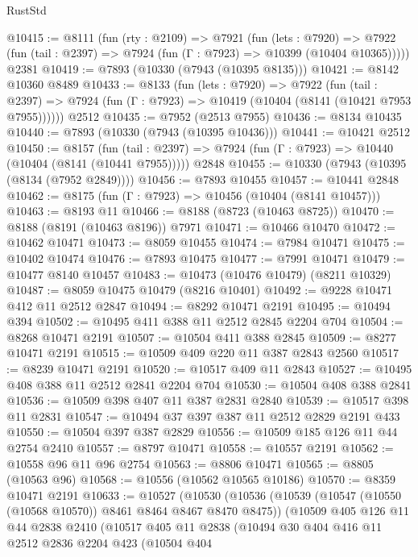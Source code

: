 \begin{lexlean}{RustStd}
\begin{coremodule}
{\begin{coremodule}
{{{{{{{{{{{{{{{{{{{{{{{{{{{{{{{{{{{{{{{{{{{{{{{{{{@10415 := @8111
    (fun (rty : @2109) =>
    @7921
      (fun (lets : @7920) =>
      @7922 (fun (tail : @2397) => @7924 (fun (Γ : @7923) => @10399 (@10404 @10365)))))
    @2381
@10419 := @7893 (@10330 (@7943 (@10395 @8135)))
@10421 := @8142 @10360 @8489
@10433 := @8133
    (fun (lets : @7920) =>
    @7922
      (fun (tail : @2397) =>
      @7924 (fun (Γ : @7923) => @10419 (@10404 (@8141 (@10421 @7953 @7955))))))
    @2512
@10435 := @7952 (@2513 @7955)
@10436 := @8134 @10435
@10440 := @7893 (@10330 (@7943 (@10395 @10436)))
@10441 := @10421 @2512
@10450 := @8157
    (fun (tail : @2397) => @7924 (fun (Γ : @7923) => @10440 (@10404 (@8141 (@10441 @7955)))))
    @2848
@10455 := @10330 (@7943 (@10395 (@8134 (@7952 @2849))))
@10456 := @7893 @10455
@10457 := @10441 @2848
@10462 := @8175 (fun (Γ : @7923) => @10456 (@10404 (@8141 @10457)))
@10463 := @8193 @11
@10466 := @8188 (@8723 (@10463 @8725))
@10470 := @8188 (@8191 (@10463 @8196)) @7971
@10471 := @10466 @10470
@10472 := @10462 @10471
@10473 := @8059 @10455
@10474 := @7984 @10471
@10475 := @10402 @10474
@10476 := @7893 @10475
@10477 := @7991 @10471
@10479 := @10477 @8140 @10457
@10483 := @10473 (@10476 @10479) (@8211 @10329)
@10487 := @8059 @10475 @10479 (@8216 @10401)
@10492 := @9228 @10471 @412 @11 @2512 @2847
@10494 := @8292 @10471 @2191
@10495 := @10494 @394
@10502 := @10495 @411 @388 @11 @2512 @2845 @2204 @704
@10504 := @8268 @10471 @2191
@10507 := @10504 @411 @388 @2845
@10509 := @8277 @10471 @2191
@10515 := @10509 @409 @220 @11 @387 @2843 @2560
@10517 := @8239 @10471 @2191
@10520 := @10517 @409 @11 @2843
@10527 := @10495 @408 @388 @11 @2512 @2841 @2204 @704
@10530 := @10504 @408 @388 @2841
@10536 := @10509 @398 @407 @11 @387 @2831 @2840
@10539 := @10517 @398 @11 @2831
@10547 := @10494 @37 @397 @387 @11 @2512 @2829 @2191 @433
@10550 := @10504 @397 @387 @2829
@10556 := @10509 @185 @126 @11 @44 @2754 @2410
@10557 := @8797 @10471
@10558 := @10557 @2191
@10562 := @10558 @96 @11 @96 @2754
@10563 := @8806 @10471
@10565 := @8805 (@10563 @96)
@10568 := @10556 (@10562 @10565 @10186)
@10570 := @8359 @10471 @2191
@10633 := @10527
    (@10530
      (@10536
        (@10539 (@10547 (@10550 (@10568 @10570)) @8461 @8464 @8467 @8470 @8475))
        (@10509
          @405
          @126
          @11
          @44
          @2838
          @2410
          (@10517
            @405
            @11
            @2838
            (@10494
              @30
              @404
              @416
              @11
              @2512
              @2836
              @2204
              @423
              (@10504
                @404
}}}}}}}}}}}}}}}}}}}}}}}}}}}}}}}}}}}}}}}}}}}}}}}}}}
\end{coremodule}}
\end{coremodule}
\end{lexlean}
